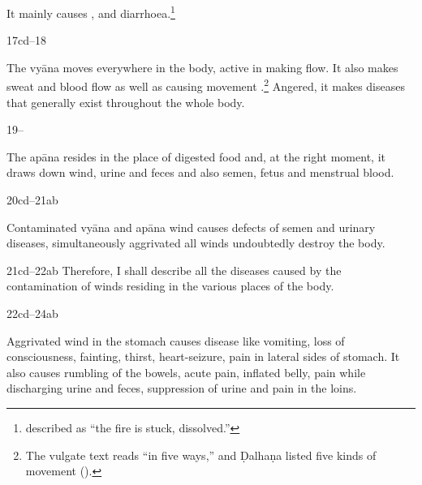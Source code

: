 \begin{translation}
It mainly causes ,  and diarrhoea.\footnote{ described 
 as “the fire is stuck, dissolved.”}



\item[17cd--18] 

The vyāna moves everywhere in the body, active in making
 flow.   It also makes sweat and blood flow as well as
causing movement .\footnote{The vulgate text
    reads  “in five ways,” and Ḍalhaṇa listed five kinds of
    movement ().} Angered, it  makes diseases that
    generally exist throughout the whole body.
    
    \item [19--]
    
The apāna resides in the place of digested food and, at the right moment, it 
draws down wind, urine and feces and also semen, fetus and menstrual blood. 



%

\item[20cd--21ab]

Contaminated vyāna and apāna wind causes defects of semen and urinary diseases,
simultaneously aggrivated all winds undoubtedly destroy the body.


\item[21cd--22ab] Therefore, I shall describe all the diseases caused by the 
contamination of winds residing in the various places of the body.

\item[22cd--24ab] 

Aggrivated wind in the stomach causes disease like
vomiting, loss of consciousness, fainting, thirst, heart-seizure, pain in
lateral sides of stomach. It also causes rumbling of the bowels, acute
pain, inflated belly, pain while discharging urine and feces, suppression
of urine and pain in the loins.


\end{translation}
